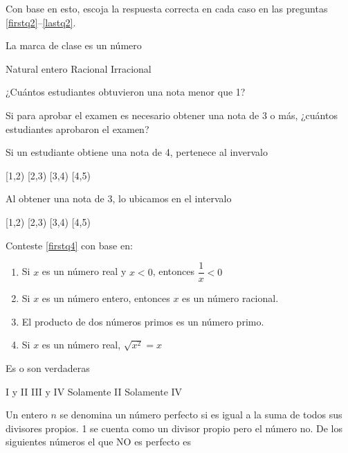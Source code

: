 \documentclass[10pt,letterpaper,addpoints]{exam}
\begin{document}
\begin{multicols}{2}
\begin{questions}
\begin{uplevel}
{ Con base en esto, escoja la respuesta correcta en cada caso en las preguntas \ref{firstq2}--\ref{lastq2}.}
\end{uplevel}
\question \label{firstq2} La marca de clase es un número
\begin{choices}
 \choice Natural
 \choice entero
 \CorrectChoice Racional
 \choice Irracional
\end{choices}
\question ¿Cuántos estudiantes obtuvieron una nota menor que 1?

\begin{oneparchoices}
\end{oneparchoices}
\question Si para aprobar el examen es necesario obtener una nota de 3 o más, ¿cuántos estudiantes aprobaron el examen?

\begin{oneparchoices}
\end{oneparchoices}
\question Si un estudiante obtiene una nota de 4, pertenece al invervalo

\begin{oneparchoices}
 \choice [1,2) 
 \choice [2,3)
 \choice [3,4)
 \CorrectChoice [4,5)
\end{oneparchoices}
\question \label{lastq2} Al obtener una nota de 3, lo ubicamos en el intervalo

\begin{oneparchoices}
 \choice [1,2)
 \choice [2,3)
 \CorrectChoice [3,4)
 \choice [4,5)
\end{oneparchoices}
\begin{uplevel}{Conteste \ref{firstq4} con base en:
\begin{enumerate}
 \item[I] Si $x$ es un número real y $x<0$, entonces $\dfrac{1}{x}<0$
 \item[II] Si $x$ es un número entero, entonces $x$ es un número racional.
 \item[III] El producto de dos números primos es un número primo.
 \item[IV] Si $x$ es un número real, $\sqrt{x^{2}}=x$
\end{enumerate}
 }
\end{uplevel}
\question \label{firstq4} Es o son verdaderas

\begin{choices}
 \CorrectChoice I y II
 \choice III y IV
 \choice Solamente II
 \choice Solamente IV
\end{choices}
\question Un entero $n$ se denomina un número perfecto si es igual a la suma de todos sus divisores propios. 1 se cuenta como un divisor propio pero el número no. De los siguientes números el que NO es perfecto es


\end{questions}
\end{multicols}
\end{document}
